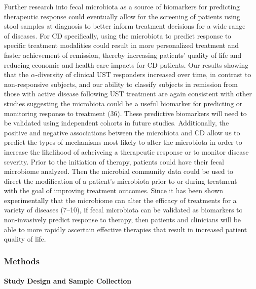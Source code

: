 \documentclass[12pt,]{article}
\let\oldparagraph\paragraph
\renewcommand{\paragraph}[1]{\oldparagraph{#1}\mbox{}}
\begin{document}
Further research into fecal microbiota as a source of biomarkers for
predicting therapeutic response could eventually allow for the screening
of patients using stool samples at diagnosis to better inform treatment
decisions for a wide range of diseases. For CD specifically, using the
microbiota to predict response to specific treatment modalities could
result in more personalized treatment and faster achievement of
remission, thereby increasing patients' quality of life and reducing
economic and health care impacts for CD patients. Our results showing
that the \({\alpha}\)-diversity of clinical UST responders increased
over time, in contrast to non-responsive subjects, and our ability to
classify subjects in remission from those with active disease following
UST treatment are again consistent with other studies suggesting the
microbiota could be a useful biomarker for predicting or monitoring
response to treatment (36). These predictive biomarkers will need to be
validated using independent cohorts in future studies. Additionally, the
positive and negative associations between the microbiota and CD allow
us to predict the types of mechanisms most likely to alter the
microbiota in order to increase the likelihood of acheiveing a
therapeutic response or to monitor disease severity. Prior to the
initiation of therapy, patients could have their fecal microbiome
analyzed. Then the microbial community data could be used to direct the
modification of a patient's microbiota prior to or during treatment with
the goal of improving treatment outcomes. Since it has been shown
experimentally that the microbiome can alter the efficacy of treatments
for a variety of diseases (7--10), if fecal microbiota can be validated
as biomarkers to non-invasively predict response to therapy, then
patients and clinicians will be able to more rapidly ascertain effective
therapies that result in increased patient quality of life.

\newpage

\subsubsection{Methods}\label{methods}

\paragraph{Study Design and Sample
Collection}\label{study-design-and-sample-collection}
\end{document}
